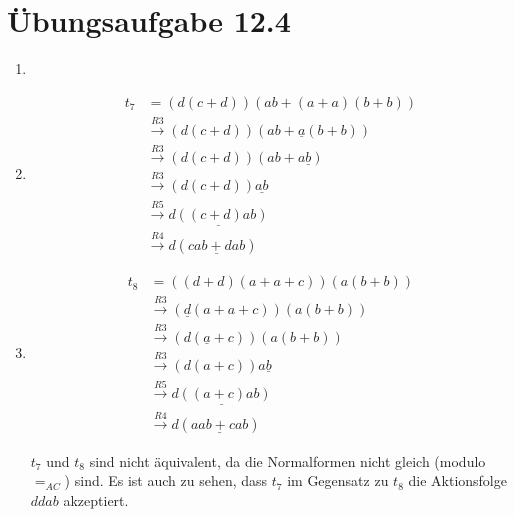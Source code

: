 \documentclass[a4paper]{scrartcl}
\begin{document}
\section*{Übungsaufgabe 12.4} 
\begin{enumerate}
    \item

    \item
        \begin{equation}
            \begin{split}
                t_7 &= (d(c + d))(ab + (a + a)(b + b)) \\
                &\stackrel{R3}{\longrightarrow} (d(c + d))(ab + \underline{a}(b + b)) \\
                &\stackrel{R3}{\longrightarrow} (d(c + d))(ab + a\underline{b}) \\
                &\stackrel{R3}{\longrightarrow} (d(c + d))\underline{ab} \\
                &\stackrel{R5}{\longrightarrow} \underline{d((c + d)ab)} \\
                &\stackrel{R4}{\longrightarrow} d(\underline{cab + dab})
            \end{split}
        \end{equation}

    \item
        \begin{equation}
            \begin{split}
                t_8 &= ((d + d)(a + a + c))(a(b + b)) \\
                &\stackrel{R3}{\longrightarrow} (\underline{d}(a + a + c))(a(b + b)) \\
                &\stackrel{R3}{\longrightarrow} (d(\underline{a} + c))(a(b + b)) \\
                &\stackrel{R3}{\longrightarrow} (d(a + c))a\underline{b} \\
                &\stackrel{R5}{\longrightarrow} \underline{d((a + c)ab)} \\
                &\stackrel{R4}{\longrightarrow} d(\underline{aab + cab})
            \end{split}
        \end{equation}

        $t_7$ und $t_8$ sind nicht äquivalent, da die Normalformen nicht gleich
        (modulo $=_{AC}$) sind.
        Es ist auch zu sehen, dass $t_7$ im Gegensatz zu $t_8$ die Aktionsfolge
        $ddab$ akzeptiert.

\end{enumerate}
\end{document}
